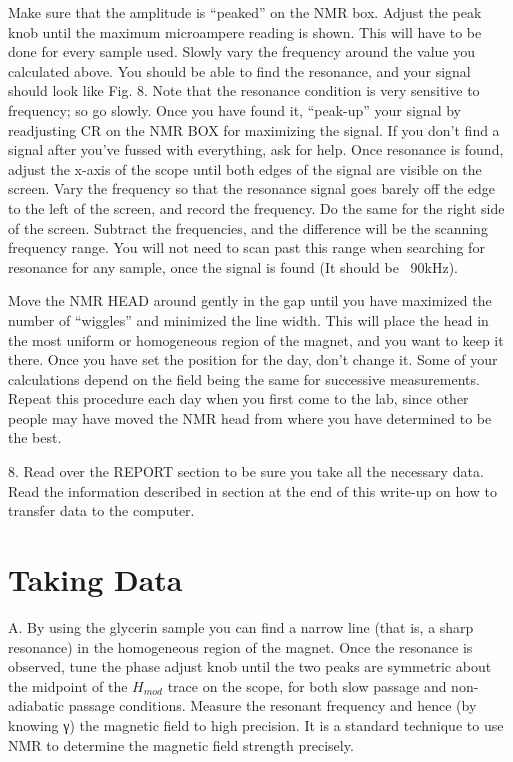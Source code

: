 \documentclass{../lab}
\begin{document}
Make sure that the amplitude is ``peaked'' on the NMR box. Adjust the peak knob until the maximum microampere reading is shown. This will have to be done for every sample used. Slowly vary the frequency around the value you calculated above. You should be able to find the resonance, and your signal should look like Fig. 8. Note that the resonance condition is very sensitive to frequency; so go slowly. Once you have found it, ``peak-up'' your signal by readjusting CR on the NMR BOX for maximizing the signal. If you don't find a signal after you've fussed with everything, ask for help. Once resonance is found, adjust the x-axis of the scope until both edges of the signal are visible on the screen. Vary the frequency so that the resonance signal goes barely off the edge to the left of the screen, and record the frequency. Do the same for the right side of the screen. Subtract the frequencies, and the difference will be the scanning frequency range. You will not need to scan past this range when searching for resonance for any sample, once the signal is found (It should be ~90kHz).

Move the NMR HEAD around gently in the gap until you have maximized the number of ``wiggles'' and minimized the line width. This will place the head in the most uniform or homogeneous region of the magnet, and you want to keep it there. Once you have set the position for the day, don't change it. Some of your calculations depend on the field being the same for successive measurements. Repeat this procedure each day when you first come to the lab, since other people may have moved the NMR head from where you have determined to be the best.

8. Read over the REPORT section to be sure you take all the necessary data. Read the information described in section at the end of this write-up on how to transfer data to the computer.

\section{Taking Data}

A. By using the glycerin sample you can find a narrow line (that is, a sharp resonance) in the homogeneous region of the magnet. Once the resonance is observed, tune the phase adjust knob until the two peaks are symmetric about the midpoint of the $ H_{mod}$ trace on the scope, for both slow passage and non-adiabatic passage conditions. Measure the resonant frequency and hence (by knowing γ) the magnetic field to high precision. It is a standard technique to use NMR to determine the magnetic field strength precisely.
\end{document}

